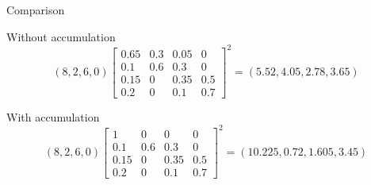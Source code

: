 \begin{frame}{Comparison}
	
		Without accumulation
		$$
		(8,2,6,0)
		{\begin{bmatrix}
		0.65 & 0.3 & 0.05 & 0\\
		0.1  & 0.6 & 0.3  & 0\\
		0.15 & 0   & 0.35 & 0.5\\
		0.2  & 0   & 0.1  & 0.7
		\end{bmatrix}}^2
		=
		(5.52,4.05,2.78,3.65)
		$$
		
		With accumulation
$$
(8,2,6,0)
{\begin{bmatrix}
1 & 0 & 0 & 0\\
0.1  & 0.6 & 0.3  & 0\\
0.15 & 0   & 0.35 & 0.5\\
0.2  & 0   & 0.1  & 0.7
\end{bmatrix}}^2
=
(10.225,0.72,1.605,3.45)
$$
	
\end{frame}
